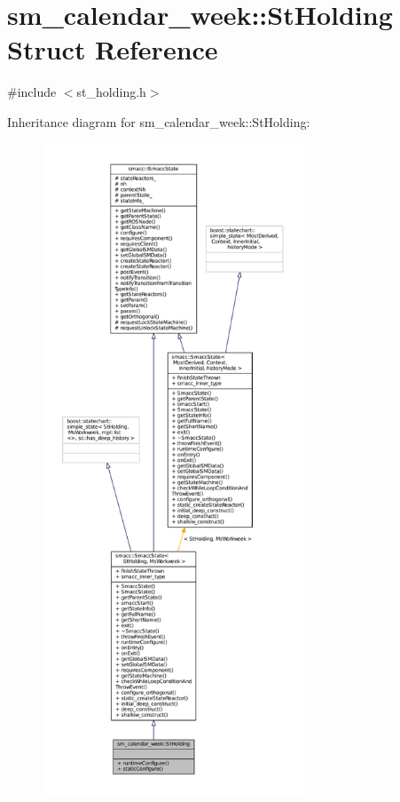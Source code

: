 \hypertarget{structsm__calendar__week_1_1StHolding}{}\section{sm\+\_\+calendar\+\_\+week\+:\+:St\+Holding Struct Reference}
\label{structsm__calendar__week_1_1StHolding}


{\ttfamily \#include $<$st\+\_\+holding.\+h$>$}



Inheritance diagram for sm\+\_\+calendar\+\_\+week\+:\+:St\+Holding\+:
\nopagebreak
\begin{figure}[H]
\begin{center}
\leavevmode
\includegraphics[height=550pt]{structsm__calendar__week_1_1StHolding__inherit__graph}
\end{center}
\end{figure}


